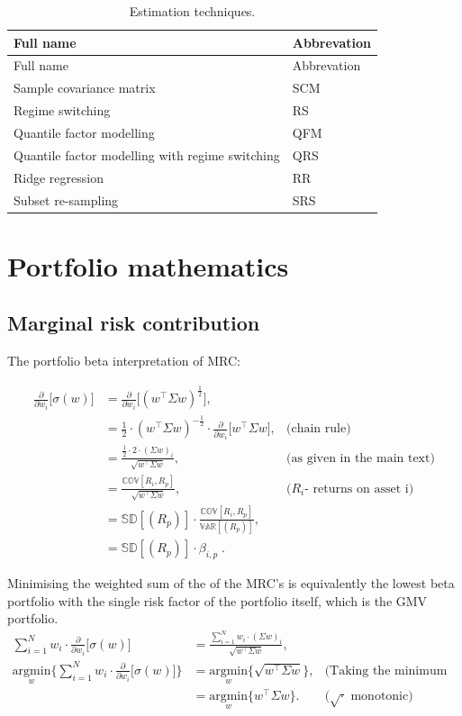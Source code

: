 \documentclass[
]{article}
\begin{document}
\begin{longtable}[]{@{}ll@{}}
\caption{\label{tab:esttech} Estimation techniques.}\tabularnewline
\toprule
Full name & Abbrevation\tabularnewline
\midrule
\endfirsthead
\toprule
Full name & Abbrevation\tabularnewline
\midrule
\endhead
Sample covariance matrix & SCM\tabularnewline
Regime switching & RS\tabularnewline
Quantile factor modelling & QFM\tabularnewline
Quantile factor modelling with regime switching & QRS\tabularnewline
Ridge regression & RR\tabularnewline
Subset re-sampling & SRS\tabularnewline
\bottomrule
\end{longtable}

\hypertarget{portfolio-mathematics}{%
\section{Portfolio mathematics}\label{portfolio-mathematics}}

\hypertarget{mrcapp}{%
\subsection{Marginal risk contribution}\label{mrcapp}}

The portfolio beta interpretation of MRC:

\begin{align*}
\frac{\partial}{\partial w_i} \Big [ \sigma(w) \Big ] & = \frac{\partial}{\partial w_i}  \Big [ (w^\intercal \Sigma w)^{\frac{1}{2}} \Big ], & \\
& = \frac{1}{2} \cdot (w^\intercal \Sigma w)^{-\frac{1}{2}} \cdot \frac{\partial}{\partial w_i} \Big [ w^\intercal \Sigma w \Big ], &  \text{(chain rule)} \\
& = \frac{\frac{1}{2}\cdot 2 \cdot (\Sigma w)_i}{\sqrt{w^\intercal \Sigma w}}, &  \text{(as given in the main text)} \\
& = \frac{\mathbb{COV}[R_i, R_p]}{\sqrt{w^\intercal \Sigma w}}, &   \text{($R_i$- returns on asset i)} \\
& = \mathbb{SD}[(R_p)] \cdot  \frac{\mathbb{COV}[R_i, R_p]}{\mathbb{VAR}[(R_p)]}, & \\
& = \mathbb{SD}[(R_p)] \cdot \beta_{i, p}\;. &
\end{align*}

Minimising the weighted sum of the of the MRC's is equivalently the lowest beta portfolio with the
single risk factor of the portfolio itself, which is the GMV portfolio.
\begin{align*}
\sum_{i = 1}^N w_i \cdot \frac{\partial}{\partial w_i} \Big [ \sigma(w) \Big ] & = \frac{\sum_{i = 1}^N w_i \cdot (\Sigma w)_i}{\sqrt{w^\intercal \Sigma w}}, & \\
\underset{w}{\text{argmin}} \Big \{\sum_{i = 1}^N w_i \cdot \frac{\partial}{\partial w_i} \Big [ \sigma(w) \Big ]  \Big \} & = \underset{w}{\text{argmin}} \Big \{ \sqrt{w^\intercal \Sigma w} \Big\},&   \text{(Taking the minimum on   both sides)}\\
& = \underset{w}{\text{argmin}} \Big \{w^\intercal \Sigma w \} . &  \text{($\sqrt{\cdot}$ monotonic)}\\
\end{align*}
\end{document}
